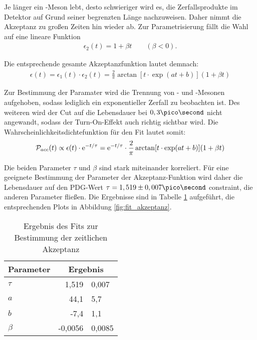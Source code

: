 Je länger ein \Bd-Meson lebt, desto schwieriger wird es, die Zerfallsprodukte im Detektor auf Grund seiner begrenzten Länge nachzuweisen. Daher nimmt die Akzeptanz zu großen Zeiten hin wieder ab. Zur Parametrisierung fällt die Wahl auf eine lineare Funktion
\begin{align}
\epsilon_2(t) = 1 + \beta t \qquad (\beta < 0).
\end{align}

Die entsprechende gesamte Akzeptanzfunktion lautet demnach:
\begin{align}
\epsilon(t) = \epsilon_1(t) \cdot \epsilon_2(t) = \frac{2}{\pi}\arctan[t\cdot \exp(at+b)](1 + \beta t)
\end{align}

Zur Bestimmung der Paramater wird die Trennung von \Bd- und \Bdbar-Mesonen aufgehoben, sodass lediglich ein exponentieller Zerfall zu beobachten ist. Des weiteren wird der Cut auf die Lebensdauer bei $0,3\pico\second$ nicht angewandt, sodass der Turn-On-Effekt auch richtig sichtbar wird. Die Wahrscheinlichkeitsdichtefunktion für den Fit lautet somit:
\begin{align}
\mathcal{P}_{acc}(t) \propto \epsilon(t)\cdot \mathrm{e}^{-t/\tau} = \mathrm{e}^{-t/\tau}\cdot\frac{2}{\pi}\arctan[t\cdot \exp(at+b)](1 + \beta t)
\end{align}

Die beiden Parameter $\tau$ und $\beta$ sind stark miteinander korreliert. Für eine geeignete Bestimmung der Parameter der Akzeptanz-Funktion wird daher die Lebensdauer auf den PDG-Wert $\tau = 1,519 \pm 0,007 \pico\second$ \cite{pdg-tau} constraint, die anderen Parameter fließen. Die Ergebnisse sind in Tabelle \ref{tab:fit_akzeptanz} aufgeführt, die entsprechenden Plots in Abbildung \ref{fig:fit_akzeptanz}. 

\begin{table}[hptb]
\centering
\caption{Ergebnis des Fits zur Bestimmung der zeitlichen Akzeptanz}
\label{tab:fit_akzeptanz}
\begin{tabular}{lr@{$\pm$}l}
\hline \hline 
Parameter & \multicolumn{2}{c}{Ergebnis}  \\ \hline
$\tau$    &  1,519   & 0,007 \\
$a$       &  44,1    & 5,7 \\
$b$       &  -7,4    & 1,1 \\
$\beta$   &  -0,0056 & 0,0085 \\ 
\hline \hline
\end{tabular}
\end{table}

